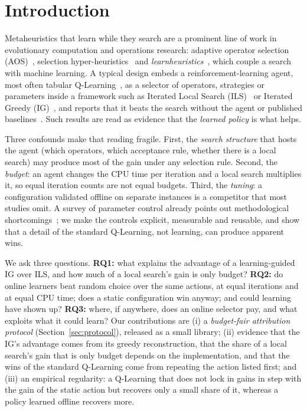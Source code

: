 \documentclass[conference,a4paper]{IEEEtran}
\begin{document}
\section{Introduction}
Metaheuristics that learn while they search are a prominent line of work in evolutionary computation and operations research: adaptive operator selection (AOS)~\cite{FialhoEtal2010,AletiMoser2016}, selection hyper-heuristics~\cite{BurkeEtal2013} and \emph{learnheuristics}~\cite{CalvetEtal2017}, which couple a search with machine learning.
A typical design embeds a reinforcement-learning agent, most often tabular Q-Learning~\cite{WatkinsDayan1992,SuttonBarto2018}, as a selector of operators, strategies or parameters inside a framework such as Iterated Local Search (ILS)~\cite{LourencaoEtal2019} or Iterated Greedy (IG)~\cite{RuizStutzle2007}, and reports that it beats the search without the agent or published baselines~\cite{KarimiMamaghanEtal2023,MissaouiOSullivan2026}.
Such results are read as evidence that the \emph{learned policy} is what helps.

Three confounds make that reading fragile. First, the \emph{search structure} that hosts the agent (which operators, which acceptance rule, whether there is a local search) may produce most of the gain under any selection rule.
Second, the \emph{budget}: an agent changes the CPU time per iteration and a local search multiplies it, so equal iteration counts are not equal budgets.
Third, the \emph{tuning}: a configuration validated offline on separate instances is a competitor that most studies omit.
A survey of parameter control already points out methodological shortcomings~\cite{KarafotiasEtal2015}; we make the controls explicit, measurable and reusable, and show that a detail of the standard Q-Learning, not learning, can produce apparent wins.

We ask three questions. \textbf{RQ1:} what explains the advantage of a learning-guided IG over ILS, and how much of a local search's gain is only budget?
\textbf{RQ2:} do online learners beat random choice over the same actions, at equal iterations and at equal CPU time; does a static configuration win anyway; and could learning have shown up?
\textbf{RQ3:} where, if anywhere, does an online selector pay, and what exploits what it could learn?
Our contributions are (i) a \emph{budget-fair attribution protocol} (Section~\ref{sec:protocol}), released as a small library; (ii) evidence that the IG's advantage comes from its greedy reconstruction, that the share of a local search's gain that is only budget depends on the implementation, and that the wins of the standard Q-Learning come from repeating the action listed first; and (iii) an empirical regularity: a Q-Learning that does not lock in gains in step with the gain of the static action but recovers only a small share of it, whereas a policy learned offline recovers more.
\end{document}
